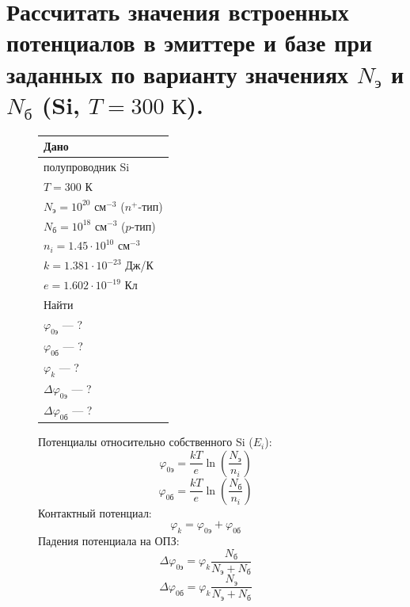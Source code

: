\documentclass[12pt,a4paper]{article}
\theoremstyle{plain}
\theoremstyle{definition}
\theoremstyle{remark}
\numberwithin{equation}{section}
\begin{document}
\section{\large\textnormal{Рассчитать значения встроенных потенциалов в эмиттере и базе при заданных по варианту значениях $N_\text{э}$ и $N_\text{б}$ (Si, $T = 300\text{ К}$).}}

\begin{figure}[H]
    \centering
    \begin{minipage}[t]{0.3\textwidth}
    \vspace{0em}
    \begin{tabularx}{\textwidth}{|X|}
        \hline
        \multicolumn{1}{|C|}{Дано} \\
        \hline
        полупроводник Si \\ 
        $T = 300$ К \\
        $N_\text{э} = 10^{20}$ см$^{-3}$ ($n^+$-тип) \\
        $N_\text{б} = 10^{18}$ см$^{-3}$ ($p$-тип) \\
        $n_i = 1.45 \cdot 10^{10}$ см$^{-3}$ \\
        $k = 1.381 \cdot 10^{-23}$ Дж/К \\
        $e = 1.602 \cdot 10^{-19}$ Кл \\
        \hline
        \multicolumn{1}{|C|}{Найти} \\
        \hline
        $\varphi_{0\text{э}}$ — ? \\
        $\varphi_{0\text{б}}$ — ? \\
        $\varphi_k$ — ? \\
        $\Delta\varphi_{0\text{э}}$ — ? \\
        $\Delta\varphi_{0\text{б}}$ — ? \\
        \hline
    \end{tabularx}

    \vspace{0.8em}
    Потенциалы относительно собственного Si ($E_i$):
    \begin{equation*}
        \varphi_{0\text{э}} = \frac{kT}{e}\ln\left(\frac{N_\text{э}}{n_i}\right)
    \end{equation*}
    \begin{equation*}
        \varphi_{0\text{б}} = \frac{kT}{e}\ln\left(\frac{N_\text{б}}{n_i}\right)
    \end{equation*}
    Контактный потенциал:
    \begin{equation*}
        \varphi_k = \varphi_{0\text{э}} + \varphi_{0\text{б}}
    \end{equation*}
    Падения потенциала на ОПЗ:
    \begin{equation*}
        \Delta\varphi_{0\text{э}} = \varphi_k \frac{N_\text{б}}{N_\text{э} + N_\text{б}}
    \end{equation*}
    \begin{equation*}
        \Delta\varphi_{0\text{б}} = \varphi_k \frac{N_\text{э}}{N_\text{э} + N_\text{б}}
    \end{equation*}


\end{minipage}
\end{figure}
\end{document}
